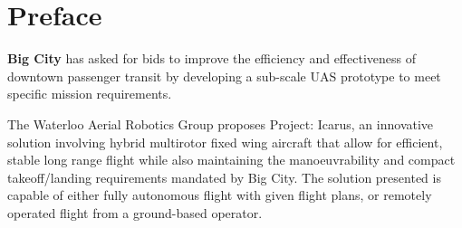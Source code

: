 \section{Preface}
\label{sec:preface}

\textbf{Big City} has asked for bids to improve the efficiency and
effectiveness of downtown passenger transit by developing a sub-scale UAS
prototype to meet specific mission requirements.

The Waterloo Aerial Robotics Group proposes Project: Icarus, an innovative
solution involving hybrid multirotor fixed wing aircraft that allow for
efficient, stable long range flight while also maintaining the manoeuvrability
and compact takeoff/landing requirements mandated by Big City. The solution
presented is capable of either fully autonomous flight with given flight plans,
or remotely operated flight from a ground-based operator.
